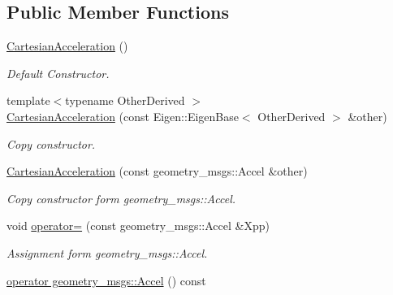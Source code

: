 \subsection*{Public Member Functions}
\begin{DoxyCompactItemize}
\item 
\hyperlink{classow__core_1_1CartesianAcceleration_a53ba452c7479d2fee4ee0285a50e2bbe}{Cartesian\+Acceleration} ()\hypertarget{classow__core_1_1CartesianAcceleration_a53ba452c7479d2fee4ee0285a50e2bbe}{}\label{classow__core_1_1CartesianAcceleration_a53ba452c7479d2fee4ee0285a50e2bbe}

\begin{DoxyCompactList}\small\item\em Default Constructor. \end{DoxyCompactList}\item 
{\footnotesize template$<$typename Other\+Derived $>$ }\\\hyperlink{classow__core_1_1CartesianAcceleration_af7b7922397256f41e7aec8324a4ba319}{Cartesian\+Acceleration} (const Eigen\+::\+Eigen\+Base$<$ Other\+Derived $>$ \&other)
\begin{DoxyCompactList}\small\item\em Copy constructor. \end{DoxyCompactList}\item 
\hyperlink{classow__core_1_1CartesianAcceleration_a00e9ba4327f15f4b81d520ff3c3b665c}{Cartesian\+Acceleration} (const geometry\+\_\+msgs\+::\+Accel \&other)\hypertarget{classow__core_1_1CartesianAcceleration_a00e9ba4327f15f4b81d520ff3c3b665c}{}\label{classow__core_1_1CartesianAcceleration_a00e9ba4327f15f4b81d520ff3c3b665c}

\begin{DoxyCompactList}\small\item\em Copy constructor form geometry\+\_\+msgs\+::\+Accel. \end{DoxyCompactList}\item 
void \hyperlink{classow__core_1_1CartesianAcceleration_ac69817340dd5fd1178764c75707739b9}{operator=} (const geometry\+\_\+msgs\+::\+Accel \&Xpp)\hypertarget{classow__core_1_1CartesianAcceleration_ac69817340dd5fd1178764c75707739b9}{}\label{classow__core_1_1CartesianAcceleration_ac69817340dd5fd1178764c75707739b9}

\begin{DoxyCompactList}\small\item\em Assignment form geometry\+\_\+msgs\+::\+Accel. \end{DoxyCompactList}\item 
\hyperlink{classow__core_1_1CartesianAcceleration_a8e7cd11ab998220f6ea65970605045b7}{operator geometry\+\_\+msgs\+::\+Accel} () const \hypertarget{classow__core_1_1CartesianAcceleration_a8e7cd11ab998220f6ea65970605045b7}{}\label{classow__core_1_1CartesianAcceleration_a8e7cd11ab998220f6ea65970605045b7}


\end{DoxyCompactItemize}
